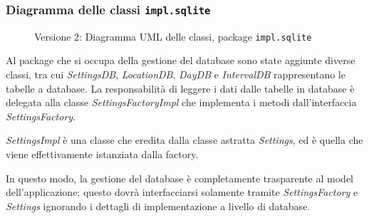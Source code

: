 \subsubsection{Diagramma delle classi \texttt{impl.sqlite}}
\vspace{0.5cm}
\begin{figure}[H]
    \centering
    \caption{Versione 2: Diagramma UML delle classi, package \texttt{impl.sqlite}}
    \label{fig:class_db_v_2}
\end{figure}

Al package che si occupa della gestione del database sono state aggiunte diverse classi, tra cui \textit{SettingsDB}, \textit{LocationDB}, \textit{DayDB} e \textit{IntervalDB}
rappresentano le tabelle a database. La responsabilità di leggere i dati dalle tabelle in database è delegata alla classe \textit{SettingsFactoryImpl} che implementa i metodi dall'interfaccia \textit{SettingsFactory}.

\textit{SettingsImpl} è una classe che eredita dalla classe astratta \textit{Settings}, ed è quella che viene effettivamente istanziata dalla factory.

In questo modo, la gestione del database è completamente trasparente al model dell'applicazione; questo dovrà interfacciarsi solamente tramite \textit{SettingsFactory} e \textit{Settings} ignorando i dettagli di implementazione a livello di database.